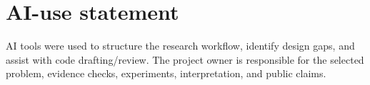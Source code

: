 \documentclass[10pt]{article}
\begin{document}
\section*{AI-use statement}
AI tools were used to structure the research workflow, identify design gaps, and assist with code drafting/review. The project owner is responsible for the selected problem, evidence checks, experiments, interpretation, and public claims.



\end{document}
